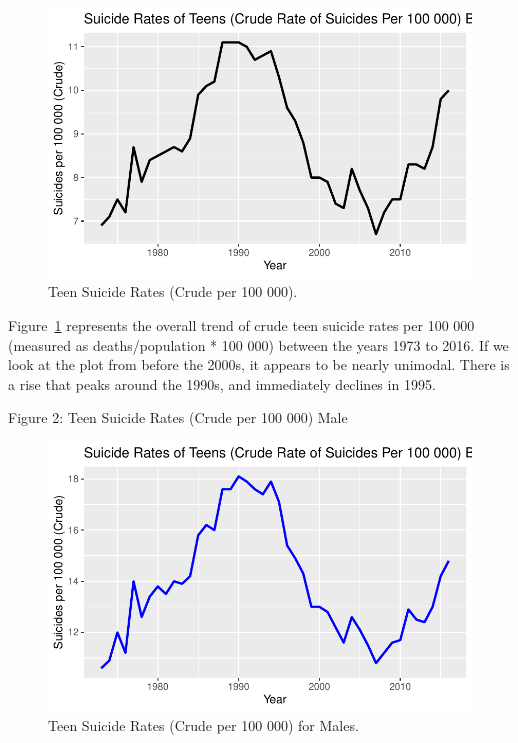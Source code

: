 \documentclass[
  letterpaper,
  DIV=11,
  numbers=noendperiod]{scrartcl}
\begin{document}
\begin{figure}

{\centering \includegraphics{paper_files/figure-pdf/fig-1-1.pdf}

}

\caption{\label{fig-1}Teen Suicide Rates (Crude per 100 000).}

\end{figure}

Figure~\ref{fig-1} represents the overall trend of crude teen suicide
rates per 100 000 (measured as deaths/population * 100 000) between the
years 1973 to 2016. If we look at the plot from before the 2000s, it
appears to be nearly unimodal. There is a rise that peaks around the
1990s, and immediately declines in 1995.

Figure 2: Teen Suicide Rates (Crude per 100 000) Male

\begin{figure}

{\centering \includegraphics{paper_files/figure-pdf/fig-2-1.pdf}

}

\caption{\label{fig-2}Teen Suicide Rates (Crude per 100 000) for Males.}

\end{figure}
\end{document}
